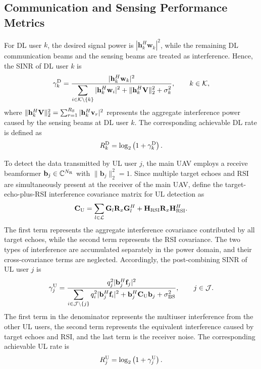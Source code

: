 \documentclass[letterpaper,journal]{IEEEtran}
\begin{document}
\subsection{Communication and Sensing Performance Metrics}
\label{subsec:performance_metrics}

For DL user $k$, the desired signal power is $|\mathbf h_k^H\mathbf w_k|^2$, while the remaining DL communication beams and the sensing beams are treated as interference. Hence, the SINR of DL user $k$ is
\begin{equation}
\gamma_k^{\rm D}
=
\frac{
|\mathbf h_k^H\mathbf w_k|^2
}{
\displaystyle
\sum_{i\in\mathcal K\setminus\{k\}}
|\mathbf h_k^H\mathbf w_i|^2
+
\|\mathbf h_k^H\mathbf V\|_2^2
+
\sigma_k^2
},
\qquad
k\in\mathcal K,
\label{eq:dl_sinr}
\end{equation}
where $\|\mathbf h_k^H\mathbf V\|_2^2=\sum_{r=1}^{R_{\rm S}}|\mathbf h_k^H\mathbf v_r|^2$ represents the aggregate interference power caused by the sensing beams at DL user $k$. The corresponding achievable DL rate is defined as
\begin{equation}
R_k^{\rm D}
=
\log_2
\left(
1+\gamma_k^{\rm D}
\right).
\label{eq:dl_rate}
\end{equation}

To detect the data transmitted by UL user $j$, the main UAV employs a receive beamformer $\mathbf b_j\in\mathbb C^{N_{\rm R}}$ with $\|\mathbf b_j\|_2^2=1$. Since multiple target echoes and RSI are simultaneously present at the receiver of the main UAV, define the target-echo-plus-RSI interference covariance matrix for UL detection as
\begin{equation}
\mathbf C_{\rm U}
=
\sum_{l\in\mathcal L}
\mathbf G_l
\mathbf R_x
\mathbf G_l^H
+
\mathbf H_{\rm RSI}
\mathbf R_x
\mathbf H_{\rm RSI}^H.
\label{eq:ul_interference_cov}
\end{equation}
The first term represents the aggregate interference covariance contributed by all target echoes, while the second term represents the RSI covariance. The two types of interference are accumulated separately in the power domain, and their cross-covariance terms are neglected. Accordingly, the post-combining SINR of UL user $j$ is
\begin{equation}
\gamma_j^{\rm U}
=
\frac{
q_j^2
|\mathbf b_j^H\mathbf f_j|^2
}{
\displaystyle
\sum_{i\in\mathcal J\setminus\{j\}}
q_i^2
|\mathbf b_j^H\mathbf f_i|^2
+
\mathbf b_j^H
\mathbf C_{\rm U}
\mathbf b_j
+
\sigma_{\rm BS}^2
},
\qquad
j\in\mathcal J.
\label{eq:ul_sinr}
\end{equation}
The first term in the denominator represents the multiuser interference from the other UL users, the second term represents the equivalent interference caused by target echoes and RSI, and the last term is the receiver noise. The corresponding achievable UL rate is
\begin{equation}
R_j^{\rm U}
=
\log_2
\left(
1+\gamma_j^{\rm U}
\right).
\label{eq:ul_rate}
\end{equation}
\end{document}
